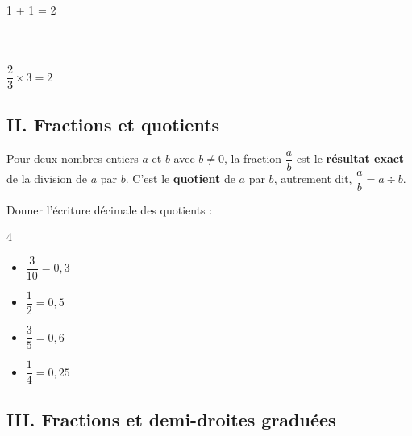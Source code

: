 \begin{Exemple}
\begin{minipage}[c]{0.8\textwidth}
\begin{center}
\end{center}
\end{minipage} \hfill
\begin{minipage}[c]{0.2\textwidth}
\begin{center}
1 + 1 = 2 \\
$ $ \\
$ $ \\
$ $ \\
$ \dfrac{2}{3} \times 3 = 2 $
\end{center}
\end{minipage}

\end{Exemple}

\subsection*{II. Fractions et quotients}


\begin{Propriété}
Pour deux nombres entiers $a$ et $b$ avec $b \neq 0$, la fraction $\dfrac{a}{b}$ est le \textbf{résultat exact} de la division de $a$ par $b$. C'est le \textbf{quotient} de $a$ par $b$, autrement dit, $\dfrac{a}{b} = a \div b$.
\end{Propriété}

\begin{Exemples}
Donner l'écriture décimale des quotients : 
\vspace{-0.5cm}
\begin{multicols}{4}
\begin{itemize}
\item $\dfrac{3}{10} = 0,3$
\item $\dfrac{1}{2} = 0,5$
\item $\dfrac{3}{5} = 0,6$
\item $\dfrac{1}{4} = 0,25$
\end{itemize}
\end{multicols}
\end{Exemples}

\subsection*{III. Fractions et demi-droites graduées}

